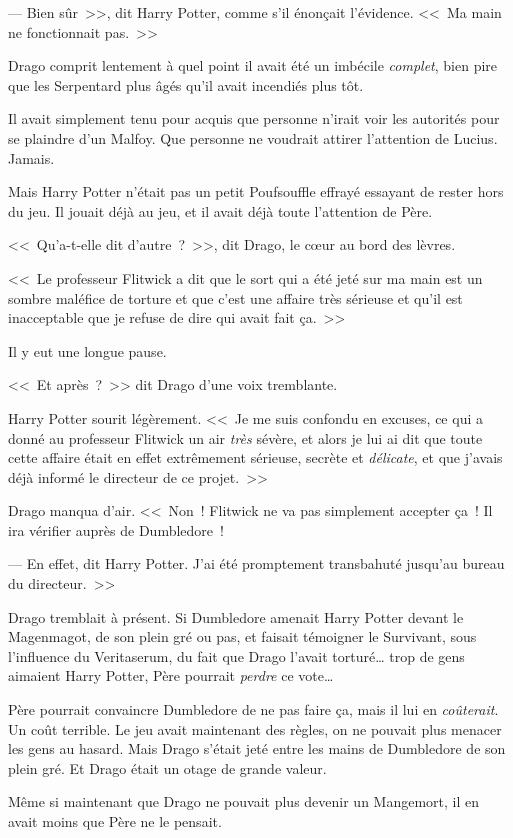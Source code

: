 --- Bien sûr~>>, dit Harry Potter, comme s'il énonçait l'évidence. <<~Ma main ne fonctionnait pas.~>>

Drago comprit lentement à quel point il avait été un imbécile \emph{complet}, bien pire que les Serpentard plus âgés qu'il avait incendiés plus tôt.

Il avait simplement tenu pour acquis que personne n'irait voir les autorités pour se plaindre d'un Malfoy. Que personne ne voudrait attirer l'attention de Lucius. Jamais.

Mais Harry Potter n'était pas un petit Poufsouffle effrayé essayant de rester hors du jeu. Il jouait déjà au jeu, et il avait déjà toute l'attention de Père.

<<~Qu'a-t-elle dit d'autre~?~>>, dit Drago, le cœur au bord des lèvres.

<<~Le professeur Flitwick a dit que le sort qui a été jeté sur ma main est un sombre maléfice de torture et que c'est une affaire très sérieuse et qu'il est inacceptable que je refuse de dire qui avait fait ça.~>>

Il y eut une longue pause.

<<~Et après~?~>> dit Drago d'une voix tremblante.

Harry Potter sourit légèrement. <<~Je me suis confondu en excuses, ce qui a donné au professeur Flitwick un air \emph{très} sévère, et alors je lui ai dit que toute cette affaire était en effet extrêmement sérieuse, secrète et \emph{délicate}, et que j'avais déjà informé le directeur de ce projet.~>>

Drago manqua d'air. <<~Non~! Flitwick ne va pas simplement accepter ça~! Il ira vérifier auprès de Dumbledore~!

--- En effet, dit Harry Potter. J'ai été promptement transbahuté jusqu'au bureau du directeur.~>>

Drago tremblait à présent. Si Dumbledore amenait Harry Potter devant le Magenmagot, de son plein gré ou pas, et faisait témoigner le Survivant, sous l'influence du Veritaserum, du fait que Drago l'avait torturé… trop de gens aimaient Harry Potter, Père pourrait \emph{perdre} ce vote…

Père pourrait convaincre Dumbledore de ne pas faire ça, mais il lui en \emph{coûterait}. Un coût terrible. Le jeu avait maintenant des règles, on ne pouvait plus menacer les gens au hasard. Mais Drago s'était jeté entre les mains de Dumbledore de son plein gré. Et Drago était un otage de grande valeur.

Même si maintenant que Drago ne pouvait plus devenir un Mangemort, il en avait moins que Père ne le pensait.

